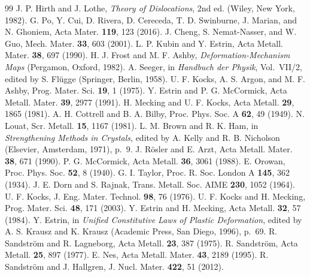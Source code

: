 \documentclass[aps,prl,twocolumn,superscriptaddress,amsmath,amssymb,floatfix]{revtex4-2}
\begin{document}
\begin{thebibliography}{99}
 J. P. Hirth and J. Lothe, \emph{Theory of Dislocations}, 2nd ed. (Wiley, New York, 1982).
 G. Po, Y. Cui, D. Rivera, D. Cereceda, T. D. Swinburne, J. Marian, and N. Ghoniem, Acta Mater. \textbf{119}, 123 (2016).
 J. Cheng, S. Nemat-Nasser, and W. Guo, Mech. Mater. \textbf{33}, 603 (2001).
 L. P. Kubin and Y. Estrin, Acta Metall. Mater. \textbf{38}, 697 (1990).
 H. J. Frost and M. F. Ashby, \emph{Deformation-Mechanism Maps} (Pergamon, Oxford, 1982).
 A. Seeger, in \emph{Handbuch der Physik}, Vol.~VII/2, edited by S. Fl\"ugge (Springer, Berlin, 1958).
 U. F. Kocks, A. S. Argon, and M. F. Ashby, Prog. Mater. Sci. \textbf{19}, 1 (1975).
 Y. Estrin and P. G. McCormick, Acta Metall. Mater. \textbf{39}, 2977 (1991).
 H. Mecking and U. F. Kocks, Acta Metall. \textbf{29}, 1865 (1981).
 A. H. Cottrell and B. A. Bilby, Proc. Phys. Soc. A \textbf{62}, 49 (1949).
 N. Louat, Scr. Metall. \textbf{15}, 1167 (1981).
 L. M. Brown and R. K. Ham, in \emph{Strengthening Methods in Crystals}, edited by A. Kelly and R. B. Nicholson (Elsevier, Amsterdam, 1971), p.~9.
 J. R\"osler and E. Arzt, Acta Metall. Mater. \textbf{38}, 671 (1990).
 P. G. McCormick, Acta Metall. \textbf{36}, 3061 (1988).
 E. Orowan, Proc. Phys. Soc. \textbf{52}, 8 (1940).
 G. I. Taylor, Proc. R. Soc. London A \textbf{145}, 362 (1934).
 J. E. Dorn and S. Rajnak, Trans. Metall. Soc. AIME \textbf{230}, 1052 (1964).
 U. F. Kocks, J. Eng. Mater. Technol. \textbf{98}, 76 (1976).
 U. F. Kocks and H. Mecking, Prog. Mater. Sci. \textbf{48}, 171 (2003).
 Y. Estrin and H. Mecking, Acta Metall. \textbf{32}, 57 (1984).
 Y. Estrin, in \emph{Unified Constitutive Laws of Plastic Deformation}, edited by A. S. Krausz and K. Krausz (Academic Press, San Diego, 1996), p.~69.
 R. Sandstr\"om and R. Lagneborg, Acta Metall. \textbf{23}, 387 (1975).
 R. Sandstr\"om, Acta Metall. \textbf{25}, 897 (1977).
 E. Nes, Acta Metall. Mater. \textbf{43}, 2189 (1995).
 R. Sandstr\"om and J. Hallgren, J. Nucl. Mater. \textbf{422}, 51 (2012).

\end{thebibliography}
\end{document}
